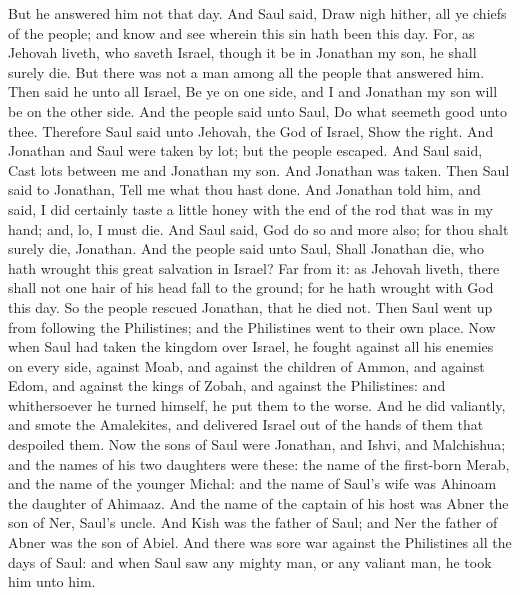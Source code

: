But he answered him not that day. And Saul said, Draw nigh hither, all ye chiefs of the people; and know and see wherein this sin hath been this day. For, as Jehovah liveth, who saveth Israel, though it be in Jonathan my son, he shall surely die. But there was not a man among all the people that answered him. Then said he unto all Israel, Be ye on one side, and I and Jonathan my son will be on the other side. And the people said unto Saul, Do what seemeth good unto thee. Therefore Saul said unto Jehovah, the God of Israel, Show the right. And Jonathan and Saul were taken by lot; but the people escaped. And Saul said, Cast lots between me and Jonathan my son. And Jonathan was taken.  Then Saul said to Jonathan, Tell me what thou hast done. And Jonathan told him, and said, I did certainly taste a little honey with the end of the rod that was in my hand; and, lo, I must die. And Saul said, God do so and more also; for thou shalt surely die, Jonathan. And the people said unto Saul, Shall Jonathan die, who hath wrought this great salvation in Israel? Far from it: as Jehovah liveth, there shall not one hair of his head fall to the ground; for he hath wrought with God this day. So the people rescued Jonathan, that he died not. Then Saul went up from following the Philistines; and the Philistines went to their own place.  Now when Saul had taken the kingdom over Israel, he fought against all his enemies on every side, against Moab, and against the children of Ammon, and against Edom, and against the kings of Zobah, and against the Philistines: and whithersoever he turned himself, he put them to the worse. And he did valiantly, and smote the Amalekites, and delivered Israel out of the hands of them that despoiled them.  Now the sons of Saul were Jonathan, and Ishvi, and Malchishua; and the names of his two daughters were these: the name of the first-born Merab, and the name of the younger Michal: and the name of Saul’s wife was Ahinoam the daughter of Ahimaaz. And the name of the captain of his host was Abner the son of Ner, Saul’s uncle. And Kish was the father of Saul; and Ner the father of Abner was the son of Abiel.  And there was sore war against the Philistines all the days of Saul: and when Saul saw any mighty man, or any valiant man, he took him unto him. 


